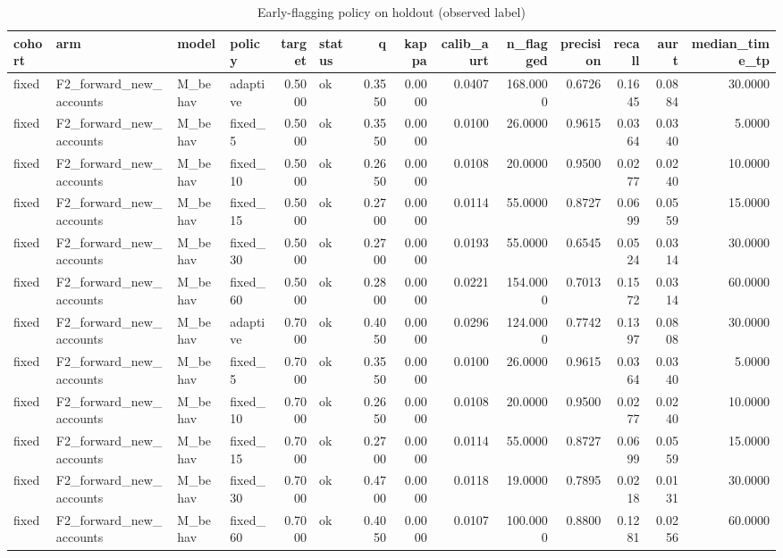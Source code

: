 \begin{table}
\caption{Early-flagging policy on holdout (observed label)}
\label{tab:tab_policy_final}
\begin{tabular}{llllrlrrrrrrrr}
\toprule
cohort & arm & model & policy & target & status & q & kappa & calib\_aurt & n\_flagged & precision & recall & aurt & median\_time\_tp \\
\midrule
fixed & F2\_forward\_new\_accounts & M\_behav & adaptive & 0.5000 & ok & 0.3550 & 0.0000 & 0.0407 & 168.0000 & 0.6726 & 0.1645 & 0.0884 & 30.0000 \\
fixed & F2\_forward\_new\_accounts & M\_behav & fixed\_5 & 0.5000 & ok & 0.3550 & 0.0000 & 0.0100 & 26.0000 & 0.9615 & 0.0364 & 0.0340 & 5.0000 \\
fixed & F2\_forward\_new\_accounts & M\_behav & fixed\_10 & 0.5000 & ok & 0.2650 & 0.0000 & 0.0108 & 20.0000 & 0.9500 & 0.0277 & 0.0240 & 10.0000 \\
fixed & F2\_forward\_new\_accounts & M\_behav & fixed\_15 & 0.5000 & ok & 0.2700 & 0.0000 & 0.0114 & 55.0000 & 0.8727 & 0.0699 & 0.0559 & 15.0000 \\
fixed & F2\_forward\_new\_accounts & M\_behav & fixed\_30 & 0.5000 & ok & 0.2700 & 0.0000 & 0.0193 & 55.0000 & 0.6545 & 0.0524 & 0.0314 & 30.0000 \\
fixed & F2\_forward\_new\_accounts & M\_behav & fixed\_60 & 0.5000 & ok & 0.2800 & 0.0000 & 0.0221 & 154.0000 & 0.7013 & 0.1572 & 0.0314 & 60.0000 \\
fixed & F2\_forward\_new\_accounts & M\_behav & adaptive & 0.7000 & ok & 0.4050 & 0.0000 & 0.0296 & 124.0000 & 0.7742 & 0.1397 & 0.0808 & 30.0000 \\
fixed & F2\_forward\_new\_accounts & M\_behav & fixed\_5 & 0.7000 & ok & 0.3550 & 0.0000 & 0.0100 & 26.0000 & 0.9615 & 0.0364 & 0.0340 & 5.0000 \\
fixed & F2\_forward\_new\_accounts & M\_behav & fixed\_10 & 0.7000 & ok & 0.2650 & 0.0000 & 0.0108 & 20.0000 & 0.9500 & 0.0277 & 0.0240 & 10.0000 \\
fixed & F2\_forward\_new\_accounts & M\_behav & fixed\_15 & 0.7000 & ok & 0.2700 & 0.0000 & 0.0114 & 55.0000 & 0.8727 & 0.0699 & 0.0559 & 15.0000 \\
fixed & F2\_forward\_new\_accounts & M\_behav & fixed\_30 & 0.7000 & ok & 0.4700 & 0.0000 & 0.0118 & 19.0000 & 0.7895 & 0.0218 & 0.0131 & 30.0000 \\
fixed & F2\_forward\_new\_accounts & M\_behav & fixed\_60 & 0.7000 & ok & 0.4050 & 0.0000 & 0.0107 & 100.0000 & 0.8800 & 0.1281 & 0.0256 & 60.0000 \\

\end{tabular}
\end{table}
